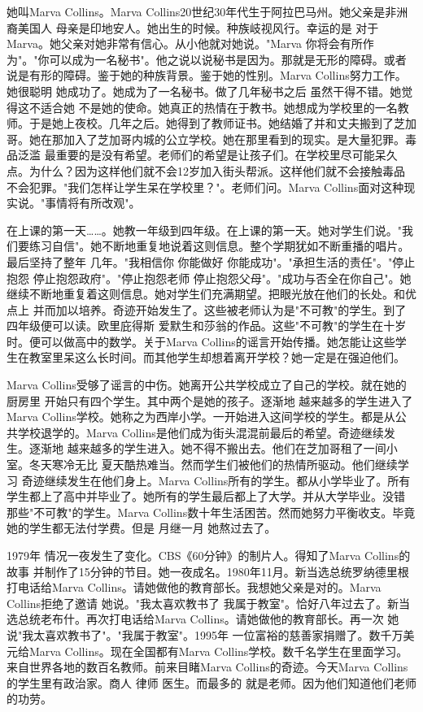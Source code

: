 她叫Marva Collins。Marva Collins20世纪30年代生于阿拉巴马州。她父亲是非洲裔美国人 母亲是印地安人。她出生的时候。种族岐视风行。幸运的是 对于Marva。她父亲对她非常有信心。从小他就对她说。"Marva 你将会有所作为"。"你可以成为一名秘书"。他之说以说秘书是因为。那就是无形的障碍。或者说是有形的障碍。鉴于她的种族背景。鉴于她的性别。Marva Collins努力工作。她很聪明 她成功了。她成为了一名秘书。做了几年秘书之后 虽然干得不错。她觉得这不适合她 不是她的使命。她真正的热情在于教书。她想成为学校里的一名教师。于是她上夜校。几年之后。她得到了教师证书。她结婚了并和丈夫搬到了芝加哥。她在那加入了芝加哥内城的公立学校。她在那里看到的现实。是大量犯罪。毒品泛滥 最重要的是没有希望。老师们的希望是让孩子们。在学校里尽可能呆久点。为什么？因为这样他们就不会12岁加入街头帮派。这样他们就不会接触毒品 不会犯罪。"我们怎样让学生呆在学校里？"。老师们问。Marva Collins面对这种现实说。"事情将有所改观"。 

在上课的第一天……。她教一年级到四年级。在上课的第一天。她对学生们说。"我们要练习自信"。她不断地重复地说着这则信息。整个学期犹如不断重播的唱片。最后坚持了整年 几年。"我相信你 你能做好 你能成功"。"承担生活的责任"。"停止抱怨 停止抱怨政府"。"停止抱怨老师 停止抱怨父母"。"成功与否全在你自己"。她继续不断地重复着这则信息。她对学生们充满期望。把眼光放在他们的长处。和优点上 并而加以培养。奇迹开始发生了。这些被老师认为是"不可教"的学生。到了四年级便可以读。欧里庇得斯 爱默生和莎翁的作品。这些"不可教"的学生在十岁时。便可以做高中的数学。关于Marva Collins的谣言开始传播。她怎能让这些学生在教室里呆这么长时间。而其他学生却想着离开学校？她一定是在强迫他们。 

Marva Collins受够了谣言的中伤。她离开公共学校成立了自己的学校。就在她的厨房里 开始只有四个学生。其中两个是她的孩子。逐渐地 越来越多的学生进入了Marva Collins学校。她称之为西岸小学。一开始进入这间学校的学生。都是从公共学校退学的。Marva Collins是他们成为街头混混前最后的希望。奇迹继续发生。逐渐地 越来越多的学生进入。她不得不搬出去。他们在芝加哥租了一间小室。冬天寒冷无比 夏天酷热难当。然而学生们被他们的热情所驱动。他们继续学习 奇迹继续发生在他们身上。Marva Collins所有的学生。都从小学毕业了。所有学生都上了高中并毕业了。她所有的学生最后都上了大学。并从大学毕业。没错 那些"不可教"的学生。Marva Collins数十年生活困苦。然而她努力平衡收支。毕竟 她的学生都无法付学费。但是 月继一月 她熬过去了。 

1979年 情况一夜发生了变化。CBS《60分钟》的制片人。得知了Marva Collins的故事 并制作了15分钟的节目。她一夜成名。1980年11月。新当选总统罗纳德里根打电话给Marva Collins。请她做他的教育部长。我想她父亲是对的。Marva Collins拒绝了邀请 她说。"我太喜欢教书了 我属于教室"。恰好八年过去了。新当选总统老布什。再次打电话给Marva Collins。请她做他的教育部长。再一次 她说"我太喜欢教书了"。"我属于教室"。1995年 一位富裕的慈善家捐赠了。数千万美元给Marva Collins。现在全国都有Marva Collins学校。数千名学生在里面学习。来自世界各地的数百名教师。前来目睹Marva Collins的奇迹。今天Marva Collins的学生里有政治家。商人 律师 医生。而最多的 就是老师。因为他们知道他们老师的功劳。 

